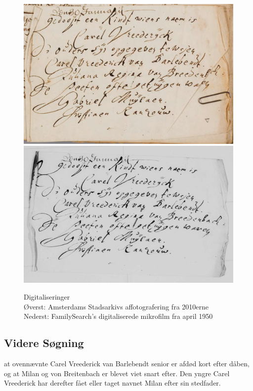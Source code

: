 \documentclass[
	a4paper,
	12pt,
	final
]{memoir}
\begin{document}
\begin{figure}[H]%
	\centerfloat%
	\includegraphics[width=\textwidth]{seddel.png}\\%
	\includegraphics[width=\textwidth]{kb-old.png}\\%
	\caption{Digitaliseringer\\\smaller Øverst: Amsterdams Stadsarkivs affotografering fra 2010erne\\Nederst: FamilySearch's digitaliserede mikrofilm fra april 1950}%
\end{figure}%

\subsection{Videre Søgning}

 at ovennævnte Carel Vreederick van Barlebendt senior er afdød kort efter dåben, og at Milan og von Breitenbach er blevet viet snart efter. Den yngre Carel Vreederick har derefter fået eller taget navnet Milan efter sin stedfader.
\end{document}
